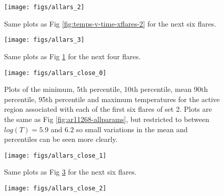 \documentclass[namedreferences]{solarphysics}
\begin{document}
\begin{article}
\begin{figure}
\begin{centering}
\texttt{[image: figs/allars\_2]} 
\par\end{centering}

\caption{Same plots as Fig \ref{fig:temps-v-time-xflares-2} for the next six flares.
\label{fig:temps-v-time-xflares-3}}
\end{figure}

\begin{figure}
\begin{centering}
\texttt{[image: figs/allars\_3]} 
\par\end{centering}

\caption{Same plots as Fig \ref{fig:temps-v-time-xflares-3} for the next four flares.\label{fig:temps-v-time-xflares-4}}
\end{figure}

\begin{figure}
\begin{centering}
\texttt{[image: figs/allars\_close\_0]} 
\par\end{centering}

\caption{Plots of the minimum, 5th percentile, 10th percentile, mean 90th percentile, 95th percentile and maximum temperatures for the active region associated with each of the first six flares of set 2.
Plots are the same as Fig \ref{fig:ar11268-allparams}, but restricted to between $log(T)=5.9$ and $6.2$ so small variations in the mean and percentiles can be seen more clearly.\label{fig:temps-v-time-xflares-1}}
\end{figure}

\begin{figure}
\begin{centering}
\texttt{[image: figs/allars\_close\_1]} 
\par\end{centering}

\caption{Same plots as Fig \ref{fig:temps-v-time-xflares-1} for the next six flares.
\label{fig:temps-v-time-xflares-1-1}}
\end{figure}


\begin{figure}
\begin{centering}
\texttt{[image: figs/allars\_close\_2]} 
\par\end{centering}


\end{figure}
\end{article}
\end{document}
